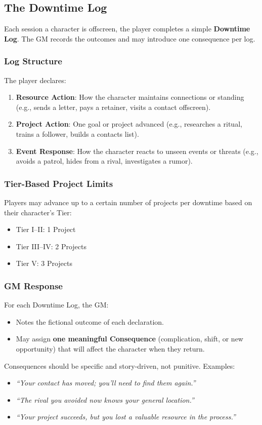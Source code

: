 \subsection{The Downtime Log}
Each session a character is offscreen, the player completes a simple \textbf{Downtime Log}. The GM records the outcomes and may introduce one consequence per log.

\subsubsection{Log Structure}
The player declares:
\begin{enumerate}
  \item \textbf{Resource Action}: How the character maintains connections or standing (e.g., sends a letter, pays a retainer, visits a contact offscreen).
  \item \textbf{Project Action}: One goal or project advanced (e.g., researches a ritual, trains a follower, builds a contacts list).
  \item \textbf{Event Response}: How the character reacts to unseen events or threats (e.g., avoids a patrol, hides from a rival, investigates a rumor).
\end{enumerate}

\subsubsection{Tier-Based Project Limits}
Players may advance up to a certain number of projects per downtime based on their character's Tier:
\begin{itemize}
  \item Tier I--II: 1 Project
  \item Tier III--IV: 2 Projects
  \item Tier V: 3 Projects
\end{itemize}

\subsubsection{GM Response}
For each Downtime Log, the GM:
\begin{itemize}
  \item Notes the fictional outcome of each declaration.
  \item May assign \textbf{one meaningful Consequence} (complication, shift, or new opportunity) that will affect the character when they return.
\end{itemize}
Consequences should be specific and story-driven, not punitive. Examples:
\begin{itemize}
  \item \textit{``Your contact has moved; you'll need to find them again.''}
  \item \textit{``The rival you avoided now knows your general location.''}
  \item \textit{``Your project succeeds, but you lost a valuable resource in the process.''}
\end{itemize}


